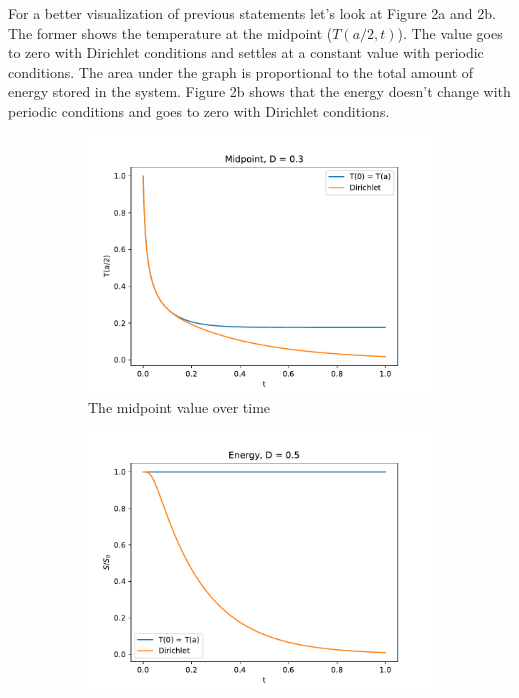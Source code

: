 \documentclass[12pt, a4paper]{article}
\begin{document}
For a better visualization of previous statements let's look at Figure 2a and 2b. The former shows the temperature at the midpoint ($T(a/2, t)$). The value goes to zero with Dirichlet conditions and settles at a constant value with periodic conditions. The area under the graph is proportional to the total amount of energy stored in the system. Figure 2b shows that the energy doesn't change with periodic conditions and goes to zero with Dirichlet conditions.

\begin{figure}[hbtp]
  \begin{subfigure}{0.5\textwidth}
  \includegraphics[width=\linewidth]{graphs/2_analysis/energy.pdf}
  \caption{The midpoint value over time} \label{fig:c}
  \end{subfigure}
  \hspace*{\fill}
  \begin{subfigure}{0.5\textwidth}
  \includegraphics[width=\linewidth]{graphs/2_analysis/energy2.pdf}

\end{subfigure}
\end{figure}
\end{document}
